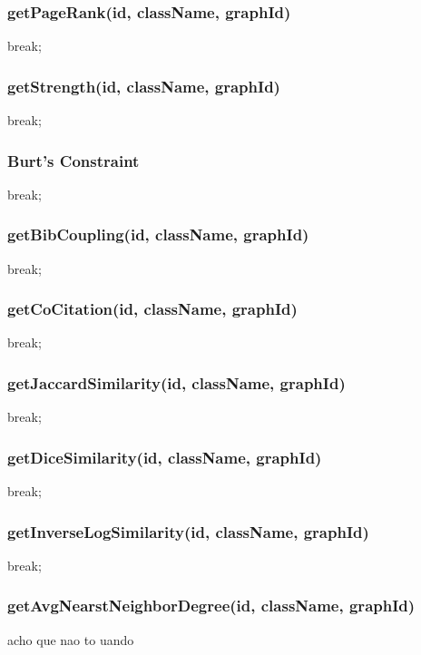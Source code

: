 \subsubsection{getPageRank(id, className, graphId)}
\label{subsubsection::pagerank}
break;



\subsubsection{getStrength(id, className, graphId)}
\label{subsubsection::strength}
break;

\subsubsection{Burt's Constraint}
\label{subsubsection::constraint}
\cite{Burt04}
break;

\subsubsection{getBibCoupling(id, className, graphId)}
break;
\subsubsection{getCoCitation(id, className, graphId)}
break;
\subsubsection{getJaccardSimilarity(id, className, graphId)}
break;
\subsubsection{getDiceSimilarity(id, className, graphId)}
break;
\subsubsection{getInverseLogSimilarity(id, className, graphId)}
break;
\subsubsection{getAvgNearstNeighborDegree(id, className, graphId)}
acho que nao to uando

